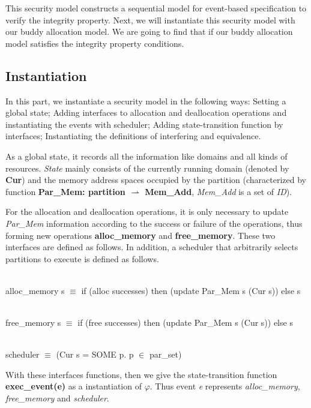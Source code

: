 This security model constructs a sequential model for event-based specification to verify the integrity property. Next, we will instantiate this security model with our buddy allocation model. We are going to find that if our buddy allocation model satisfies the integrity property conditions.

\subsection{Instantiation}
In this part, we instantiate a security model in the following ways: Setting a global state; Adding interfaces to allocation and deallocation operations and instantiating the events with scheduler; Adding state-transition function by interfaces; Instantiating the definitions of interfering and equivalence.

As a global state, it records all the information like domains and all kinds of resources. \emph{State} mainly consists of the currently running domain (denoted by \textbf{Cur}) and the memory address spaces occupied by the partition (characterized by function \textbf{Par\_Mem: partition $\rightharpoonup$ Mem\_Add}, \emph{Mem\_Add} is a set of \emph{ID}).

For the allocation and deallocation operations, it is only necessary to update \emph{Par\_Mem} information according to the success or failure of the operations, thus forming new operations \textbf{alloc\_memory} and \textbf{free\_memory}. These two interfaces are defined as follows. In addition, a scheduler that arbitrarily selects partitions to execute is defined as follows.

\begin{definition}  \\
	alloc\_memory s $\equiv$ if (alloc successes) then (update Par\_Mem s (Cur s)) else s
\end{definition}

\begin{definition}  \\
	free\_memory s $\equiv$ if (free successes) then (update Par\_Mem s (Cur s)) else s
\end{definition}

\begin{definition} [Scheduler] \\
	scheduler $\equiv$ (Cur s = SOME p. p $\in$ par\_set)
\end{definition}

With these interfaces functions, then we give the state-transition function \textbf{exec\_event(e)} as a instantiation of $\varphi$. Thus event \emph{e} represents \emph{alloc\_memory}, \emph{free\_memory} and \emph{scheduler}.

